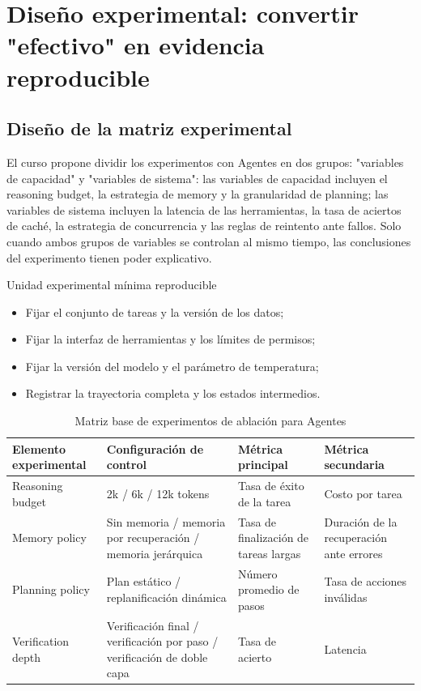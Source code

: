 \documentclass[a4paper]{article}
\begin{document}
\section{Diseño experimental: convertir "efectivo" en evidencia reproducible}

\subsection{Diseño de la matriz experimental}
El curso propone dividir los experimentos con Agentes en dos grupos: "variables de capacidad" y "variables de sistema": las variables de capacidad incluyen el reasoning budget, la estrategia de memory y la granularidad de planning; las variables de sistema incluyen la latencia de las herramientas, la tasa de aciertos de caché, la estrategia de concurrencia y las reglas de reintento ante fallos. Solo cuando ambos grupos de variables se controlan al mismo tiempo, las conclusiones del experimento tienen poder explicativo.

\begin{knowledgebox}{Unidad experimental mínima reproducible}
\begin{itemize}
    \item Fijar el conjunto de tareas y la versión de los datos;
    \item Fijar la interfaz de herramientas y los límites de permisos;
    \item Fijar la versión del modelo y el parámetro de temperatura;
    \item Registrar la trayectoria completa y los estados intermedios.
\end{itemize}
\end{knowledgebox}

\begin{table}[H]
\centering
\begin{tabular}{p{3.1cm}p{3.3cm}p{2.7cm}p{2.2cm}}
\toprule
\textbf{Elemento experimental} & \textbf{Configuración de control} & \textbf{Métrica principal} & \textbf{Métrica secundaria} \\
\midrule
Reasoning budget & 2k / 6k / 12k tokens & Tasa de éxito de la tarea & Costo por tarea \\
Memory policy & Sin memoria / memoria por recuperación / memoria jerárquica & Tasa de finalización de tareas largas & Duración de la recuperación ante errores \\
Planning policy & Plan estático / replanificación dinámica & Número promedio de pasos & Tasa de acciones inválidas \\
Verification depth & Verificación final / verificación por paso / verificación de doble capa & Tasa de acierto & Latencia \\
\bottomrule
\end{tabular}
\caption{Matriz base de experimentos de ablación para Agentes}
\end{table}
\end{document}
